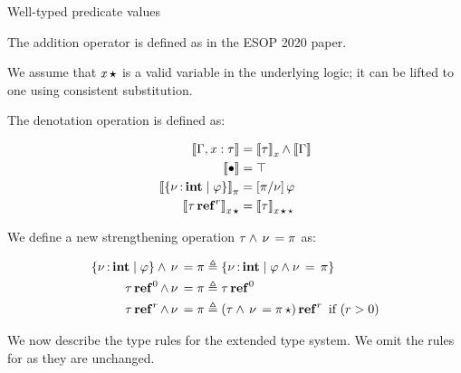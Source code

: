 \documentclass[runningheads]{llncs}
\begin{document}
Well-typed predicate values
\begin{center}
  \bcprulessavespacetrue
  \infax[Pv-Nu]{ \Gamma  \vdash  \nu }

  \infax[AP-Eps]{   \epsilon   \Downarrow   \set{  \nu  \COL \TINT \mid \_ }   }
  \bcprulessavespacefalse
\end{center}

The addition operator is defined as in the ESOP 2020 paper.

We assume that $\mathit{x} \, \oldvec{\star}$ is a valid variable in the underlying logic; it can be lifted to one using consistent substitution.

The denotation operation is defined as:

\begin{align*}
   \sem{ \Gamma  \ottsym{,}  \mathit{x}  \ottsym{:}  \tau }  & =  \sem{ \tau }_{ \mathit{x} }   \wedge   \sem{ \Gamma }  \\
   \sem{  \bullet  }  & =  \top  \\
   \sem{  \set{  \nu  \COL \TINT \mid  \varphi }  }_{ \pi }  & =  [  \pi  /  \nu  ]  \, \varphi \\
   \sem{  \tau  \TREF^{ r }  }_{ \mathit{x} \, \oldvec{\star} }  & =  \sem{ \tau }_{ \mathit{x} \, \oldvec{\star} \,  \star  }  
\end{align*}

We define a new strengthening operation $\tau  \wedge \, \nu \, =  \pi$ as:

\begin{align*} 
   \left\{{  \nu  \operatorname{:} \mathbf{int} \mid  \varphi }\right\}   \wedge \, \nu \, =  \pi & \triangleq  \left\{{  \nu  \operatorname{:} \mathbf{int} \mid   \varphi  \wedge  \nu \, = \, \pi  }\right\}  \\
   \tau  \operatorname{\mathbf{ref}}^{ 0 }   \wedge \, \nu \, =  \pi & \triangleq  \tau  \operatorname{\mathbf{ref}}^{ 0 }  \\
   \tau  \operatorname{\mathbf{ref}}^{ r }   \wedge \, \nu \, =  \pi & \triangleq  (  \tau  \wedge \, \nu \, =  \pi \,  \star   )  \operatorname{\mathbf{ref}}^{ r }  \text{ if ($r > 0$)}
\end{align*}

We now describe the type rules for the extended type system.
We omit the rules for  as they are unchanged.
\end{document}
